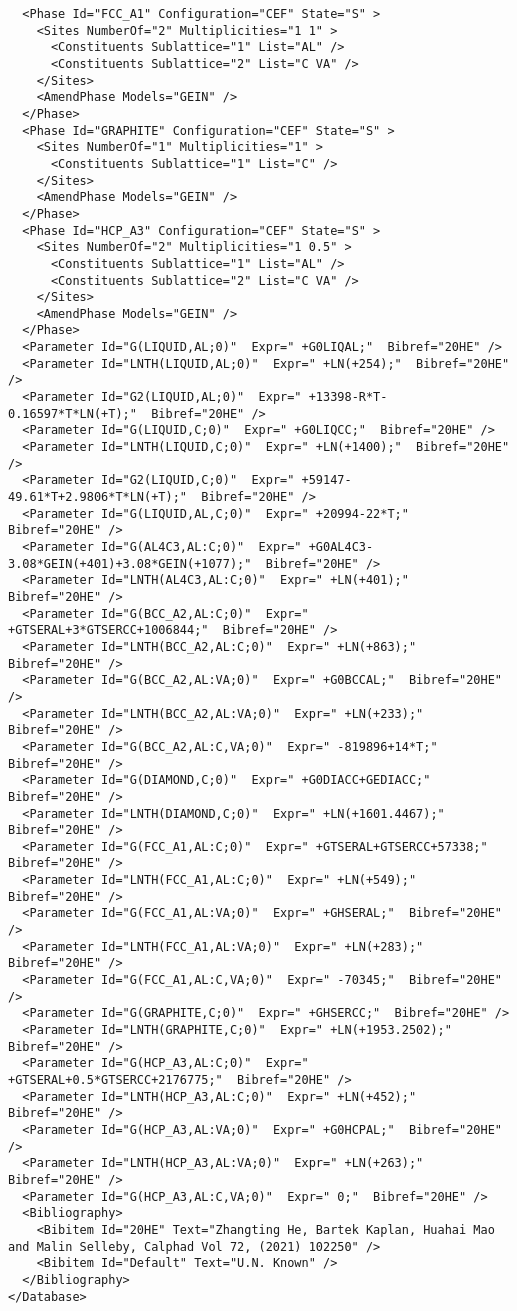 \documentclass{article}
\begin{document}
\begin{appendices}
{\begin{verbatim}
  <Phase Id="FCC_A1" Configuration="CEF" State="S" >
    <Sites NumberOf="2" Multiplicities="1 1" >
      <Constituents Sublattice="1" List="AL" />
      <Constituents Sublattice="2" List="C VA" />
    </Sites>
    <AmendPhase Models="GEIN" />
  </Phase>
  <Phase Id="GRAPHITE" Configuration="CEF" State="S" >
    <Sites NumberOf="1" Multiplicities="1" >
      <Constituents Sublattice="1" List="C" />
    </Sites>
    <AmendPhase Models="GEIN" />
  </Phase>
  <Phase Id="HCP_A3" Configuration="CEF" State="S" >
    <Sites NumberOf="2" Multiplicities="1 0.5" >
      <Constituents Sublattice="1" List="AL" />
      <Constituents Sublattice="2" List="C VA" />
    </Sites>
    <AmendPhase Models="GEIN" />
  </Phase>
  <Parameter Id="G(LIQUID,AL;0)"  Expr=" +G0LIQAL;"  Bibref="20HE" />
  <Parameter Id="LNTH(LIQUID,AL;0)"  Expr=" +LN(+254);"  Bibref="20HE" />
  <Parameter Id="G2(LIQUID,AL;0)"  Expr=" +13398-R*T-0.16597*T*LN(+T);"  Bibref="20HE" />
  <Parameter Id="G(LIQUID,C;0)"  Expr=" +G0LIQCC;"  Bibref="20HE" />
  <Parameter Id="LNTH(LIQUID,C;0)"  Expr=" +LN(+1400);"  Bibref="20HE" />
  <Parameter Id="G2(LIQUID,C;0)"  Expr=" +59147-49.61*T+2.9806*T*LN(+T);"  Bibref="20HE" />
  <Parameter Id="G(LIQUID,AL,C;0)"  Expr=" +20994-22*T;"  Bibref="20HE" />
  <Parameter Id="G(AL4C3,AL:C;0)"  Expr=" +G0AL4C3-3.08*GEIN(+401)+3.08*GEIN(+1077);"  Bibref="20HE" />
  <Parameter Id="LNTH(AL4C3,AL:C;0)"  Expr=" +LN(+401);"  Bibref="20HE" />
  <Parameter Id="G(BCC_A2,AL:C;0)"  Expr=" +GTSERAL+3*GTSERCC+1006844;"  Bibref="20HE" />
  <Parameter Id="LNTH(BCC_A2,AL:C;0)"  Expr=" +LN(+863);"  Bibref="20HE" />
  <Parameter Id="G(BCC_A2,AL:VA;0)"  Expr=" +G0BCCAL;"  Bibref="20HE" />
  <Parameter Id="LNTH(BCC_A2,AL:VA;0)"  Expr=" +LN(+233);"  Bibref="20HE" />
  <Parameter Id="G(BCC_A2,AL:C,VA;0)"  Expr=" -819896+14*T;"  Bibref="20HE" />
  <Parameter Id="G(DIAMOND,C;0)"  Expr=" +G0DIACC+GEDIACC;"  Bibref="20HE" />
  <Parameter Id="LNTH(DIAMOND,C;0)"  Expr=" +LN(+1601.4467);"  Bibref="20HE" />
  <Parameter Id="G(FCC_A1,AL:C;0)"  Expr=" +GTSERAL+GTSERCC+57338;"  Bibref="20HE" />
  <Parameter Id="LNTH(FCC_A1,AL:C;0)"  Expr=" +LN(+549);"  Bibref="20HE" />
  <Parameter Id="G(FCC_A1,AL:VA;0)"  Expr=" +GHSERAL;"  Bibref="20HE" />
  <Parameter Id="LNTH(FCC_A1,AL:VA;0)"  Expr=" +LN(+283);"  Bibref="20HE" />
  <Parameter Id="G(FCC_A1,AL:C,VA;0)"  Expr=" -70345;"  Bibref="20HE" />
  <Parameter Id="G(GRAPHITE,C;0)"  Expr=" +GHSERCC;"  Bibref="20HE" />
  <Parameter Id="LNTH(GRAPHITE,C;0)"  Expr=" +LN(+1953.2502);"  Bibref="20HE" />
  <Parameter Id="G(HCP_A3,AL:C;0)"  Expr=" +GTSERAL+0.5*GTSERCC+2176775;"  Bibref="20HE" />
  <Parameter Id="LNTH(HCP_A3,AL:C;0)"  Expr=" +LN(+452);"  Bibref="20HE" />
  <Parameter Id="G(HCP_A3,AL:VA;0)"  Expr=" +G0HCPAL;"  Bibref="20HE" />
  <Parameter Id="LNTH(HCP_A3,AL:VA;0)"  Expr=" +LN(+263);"  Bibref="20HE" />
  <Parameter Id="G(HCP_A3,AL:C,VA;0)"  Expr=" 0;"  Bibref="20HE" />
  <Bibliography>
    <Bibitem Id="20HE" Text="Zhangting He, Bartek Kaplan, Huahai Mao and Malin Selleby, Calphad Vol 72, (2021) 102250" /> 
    <Bibitem Id="Default" Text="U.N. Known" /> 
  </Bibliography>
</Database>
\end{verbatim}
}


\end{appendices}
\end{document}
